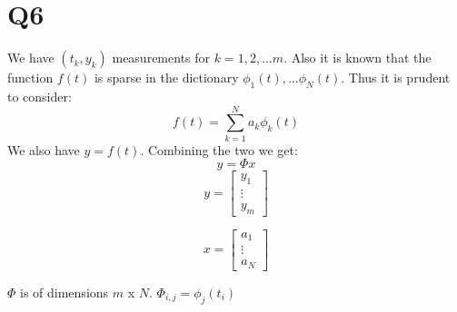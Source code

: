 \documentclass{article}
\begin{document}
\section{Q6}
We have $(t_k, y_k)$ measurements for $k = 1, 2, \ldots m$. Also it is known that the function $f(t)$ is sparse in the dictionary $\phi_1(t), \ldots \phi_N(t)$. Thus it is prudent to consider:
$$f(t) = \sum_{k=1}^N a_k \phi_k(t)$$
We also have $y = f(t)$. Combining the two we get:
$$ y = \Phi x$$
$$ y =
\begin{bmatrix}
y_1\\
\vdots\\
y_m
\end{bmatrix}$$

$$ x =
\begin{bmatrix}
a_1\\
\vdots\\
a_N
\end{bmatrix}$$

$\Phi$ is of dimensions $m$ x $N$. $\Phi_{i, j} = \phi_j(t_i)$
\end{document}
